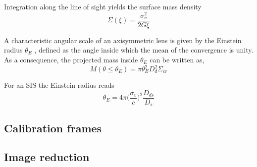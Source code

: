 Integration along the line of sight yields the surface mass density
\begin{equation}
\Sigma(\xi)=\frac{\sigma^2_{v}}{2G\xi}
\label{equ:Sigma(xi)}
\end{equation}

\noindent
A characteristic angular scale of an axisymmetric lens is given by the Einstein radius $ \theta_{E} $ , defined as the angle inside which the mean of the convergence is unity. As a consequence, the projected mass inside $ \theta_{E} $ can be written as,
\begin{equation}
M(\theta \le \theta_{E})=\pi \theta^2_{E}D^2_{d}\Sigma_{cr}
\end{equation}

For an SIS the Einstein radius reads
\begin{equation}
\theta_{E}=4\pi\bigg( \frac{\sigma_{v}}{c}\bigg)^2\frac{D_{ds}}{D_{s}}
\label{Equ:ThetaE}
\end{equation}

\subsection{Calibration frames}
\subsection{Image reduction}
